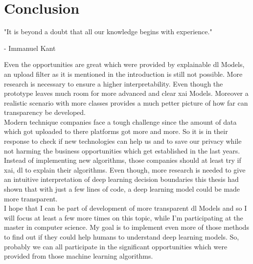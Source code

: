 
\chapter{Conclusion}
\epigraph{"It is beyond a doubt that all our knowledge begins with experience."}{- Immanuel Kant}

\label{ch:conclusion}
Even the opportunities are great which were provided by explainable \gls{dl} Models, an upload filter as it is mentioned in the introduction is still not possible. More research is necessary to ensure a higher interpretability. Even though the prototype leaves much room for more advanced and clear \gls{xai} Models. Moreover a realistic scenario with more classes provides a much petter picture of how far can transparency be developed.  \\

Modern technique companies face a tough challenge since the amount of data which got uploaded to there platforms got more and more. 
So it is in their response to check if new technologies can help us and to save our privacy while not harming the business opportunities which get established in the last years.\\

Instead of implementing new algorithms, those companies should at least try if \gls{xai}, \gls{dl} to explain their algorithms. Even though, more research is needed to give an intuitive interpretation of deep learning decision boundaries this thesis had shown that with just a few lines of code, a deep learning model could be made more transparent. \\

I hope that I can be  part of development of more transparent \gls{dl} Models and so I will focus at least a few more times on this topic, while I'm participating at the master in computer science. My goal is to implement even more of those methods to find out if they could help humans to understand deep learning models. So, probably we can all participate in the significant opportunities which were provided from those machine learning algorithms.\\

